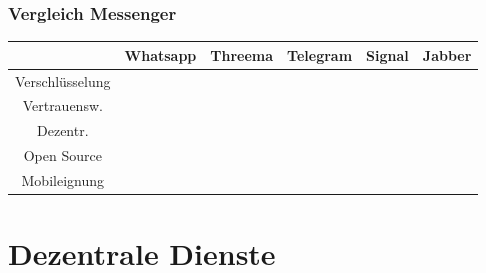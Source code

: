 \documentclass[12pt, xcolor={svgnames,table}]{beamer}
\begin{document}
\begin{frame}
  \frametitle{Vergleich Messenger}
  \small
  \begin{tabular}{|c|c|c|c|c|c|}
    \hline
                      & Whatsapp            & Threema             & Telegram              & Signal                & Jabber              \\
    \hline
    Verschlüsselung   & \cellcolor{orange}  & \cellcolor{yellow}  & \cellcolor{orange}    & \cellcolor{green}     & \cellcolor{green}   \\
    \hline
    Vertrauensw.      & \cellcolor{red}     & \cellcolor{yellow}  & \cellcolor{orange}    & \cellcolor{green}     & \cellcolor{green}   \\
    \hline
    Dezentr.          & \cellcolor{red}     & \cellcolor{red}     & \cellcolor{red}       & \cellcolor{orange}    & \cellcolor{green}   \\
    \hline
    Open Source       & \cellcolor{red}     & \cellcolor{red}     & \cellcolor{yellow}    & \cellcolor{green}     & \cellcolor{green}   \\
    \hline
    Mobileignung      & \cellcolor{green}   & \cellcolor{green}   & \cellcolor{green}     & \cellcolor{green}     & \cellcolor{yellow}  \\
    \hline
  \end{tabular}
\end{frame}

\section{Dezentrale Dienste}
\subsection{}
\end{document}

